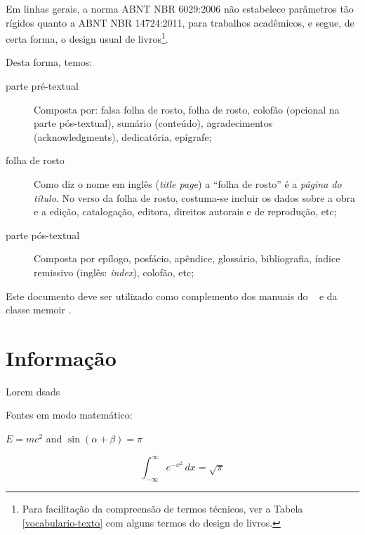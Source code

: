 \documentclass[
	12pt,				%
	openright,			%
	twoside,			%
	b5paper,			%
	english,			%
	french,				%
	brazil,				%
	sumario=tradicional
]{abntex2}
\begin{document}
Em linhas gerais, a norma ABNT NBR 6029:2006 não estabelece parâmetros tão
rígidos quanto a ABNT NBR 14724:2011, para trabalhos acadêmicos, e segue, de
certa forma, o design usual de livros\footnote{Para facilitação da compreensão
de termos técnicos, ver a Tabela \ref{vocabulario-texto} com alguns termos do
design de livros.}.

Desta forma, temos:

\begin{description}
\item[parte pré-textual] Composta por: falsa folha de rosto, folha de rosto,
colofão (opcional na parte pós-textual), sumário (conteúdo),
a\-gra\-de\-ci\-men\-tos (acknowledgments), dedicatória, epígrafe;
\item[folha de rosto] Como diz o nome em inglês (\textit{title page}) a ``folha
de rosto'' é a \textit{página do título}. No verso da folha de rosto, costuma-se
incluir os dados sobre a obra e a edição, catalogação, editora, direitos
autorais e de reprodução, etc;
\item [parte pós-textual] Composta por epílogo, posfácio, apêndice, glossário,
bibliografia, índice remissivo (inglês: \textit{index}), colofão, etc;

\end{description}

Este documento deve ser utilizado como complemento dos manuais do \abnTeX\
\cite{abntex2classe,abntex2cite,abntex2cite-alf} e da classe \textsf{memoir}
\cite{memoir}.


\chapter{Informação}

Lorem  dsads





Fontes em modo matemático:

$E=mc^2$ and $\sin(\alpha+\beta)=\pi$

\[
\int_{-\infty}^{\infty}e^{-x^2}\,dx=\sqrt{\pi}
\]
\end{document}
